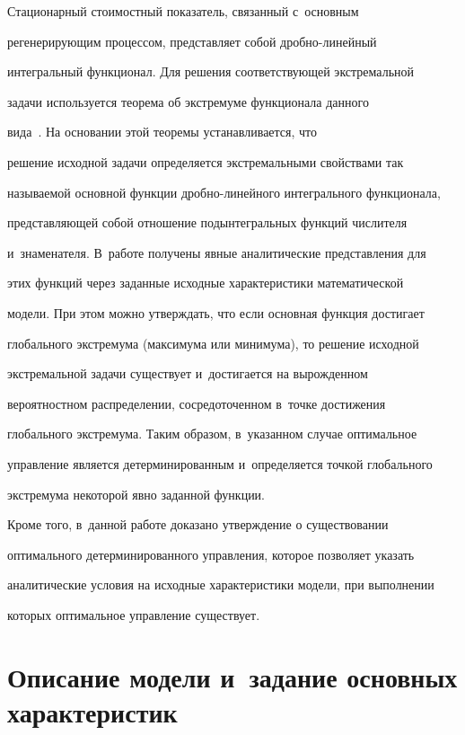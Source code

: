   

  Стационарный стоимостный показатель, связанный с~основным 

регенерирующим процессом, представляет собой дроб\-но-ли\-ней\-ный 

интегральный функционал. Для решения соответствующей экстремальной 

задачи используется теорема об экстремуме функционала данного 

вида~\cite{10-sh, 11-sh}. На основании этой теоремы устанавливается, что 

решение исходной задачи определяется экстремальными свойствами так 

называемой основной функции дроб\-но-ли\-ней\-но\-го интегрального функционала, 

представляющей собой отношение подынтегральных функций числителя 

и~знаменателя. В~работе получены явные аналитические представления для 

этих функций через заданные исходные характеристики математической 

модели. При этом можно утверждать, что если основная функция достигает 

глобального экстремума (максимума или минимума), то решение исходной 

экстремальной задачи существует и~достигается на вырожденном 

вероятностном распределении, сосредоточенном в~точке достижения 

глобального экстремума. Таким образом, в~указанном случае оптимальное 

управление является детерминированным и~определяется точкой глобального 

экстремума некоторой явно заданной функции.

  

  Кроме того, в~данной работе доказано утверждение о существовании 

оптимального детерминированного управления, которое позволяет указать 

аналитические условия на исходные характеристики модели, при выполнении 

которых оптимальное управление существует. 

  

\section{Описание модели и~задание основных характеристик}




